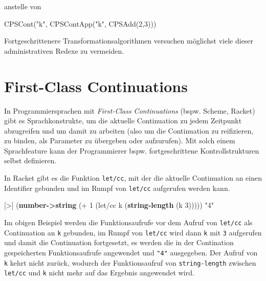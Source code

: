 \documentclass[]{article}
\newenvironment{Shaded}{}{}
\newcommand{\DecValTok}[1]{\textcolor[rgb]{0.25,0.63,0.44}{#1}}
\newcommand{\FunctionTok}[1]{\textcolor[rgb]{0.02,0.16,0.49}{#1}}
\newcommand{\KeywordTok}[1]{\textcolor[rgb]{0.00,0.44,0.13}{\textbf{#1}}}
\newcommand{\NormalTok}[1]{#1}
\newcommand{\OperatorTok}[1]{\textcolor[rgb]{0.40,0.40,0.40}{#1}}
\newcommand{\StringTok}[1]{\textcolor[rgb]{0.25,0.44,0.63}{#1}}
\begin{document}
anstelle von

\begin{Shaded}
\begin{Highlighting}[]
\FunctionTok{CPSCont}\NormalTok{(}\StringTok{"k"}\NormalTok{, }\FunctionTok{CPSContApp}\NormalTok{(}\StringTok{"k"}\NormalTok{, }\FunctionTok{CPSAdd}\NormalTok{(}\DecValTok{2}\NormalTok{,}\DecValTok{3}\NormalTok{)))}
\end{Highlighting}
\end{Shaded}

Fortgeschrittenere Transformationsalgorithmen versuchen möglichst viele
dieser administrativen Redexe zu vermeiden.

\hypertarget{first-class-continuations}{%
\section{First-Class Continuations}\label{first-class-continuations}}

In Programmiersprachen mit \emph{First-Class Continuations} (bspw.
Scheme, Racket) gibt es Sprachkonstrukte, um die aktuelle Continuation
zu jedem Zeitpunkt abzugreifen und um damit zu arbeiten (also um die
Continuation zu reifizieren, zu binden, als Parameter zu übergeben oder
aufzurufen). Mit solch einem Sprachfeature kann der Programmierer bspw.
fortgeschrittene Kontrollstrukturen selbst definieren.

In Racket gibt es die Funktion \texttt{let/cc}, mit der die aktuelle
Continuation an einen Identifier gebunden und im Rumpf von
\texttt{let/cc} aufgerufen werden kann.

\begin{Shaded}
\begin{Highlighting}[]
\OperatorTok{[\textgreater{}]}\NormalTok{ (}\KeywordTok{number{-}\textgreater{}string}\NormalTok{ (}\OperatorTok{+} \DecValTok{1}\NormalTok{ (let/cc k (}\KeywordTok{string{-}length}\NormalTok{ (k }\DecValTok{3}\NormalTok{)))))}
\StringTok{"4"}
\end{Highlighting}
\end{Shaded}

Im obigen Beispiel werden die Funktionsaufrufe vor dem Aufruf von
\texttt{let/cc} als Continuation an \texttt{k} gebunden, im Rumpf von
\texttt{let/cc} wird dann \texttt{k} mit \texttt{3} aufgerufen und damit
die Continuation fortgesetzt, es werden die in der Contination
gespeicherten Funktionsaufrufe angewendet und \texttt{"4"} ausgegeben.
Der Aufruf von \texttt{k} kehrt nicht zurück, wodurch der
Funktionsaufruf von \texttt{string-length} zwischen \texttt{let/cc} und
\texttt{k} nicht mehr auf das Ergebnis angewendet wird.
\end{document}
